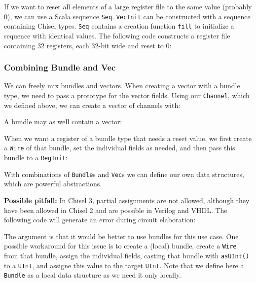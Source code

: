 \documentclass[%
    10pt,
    headinclude, footexclude,
    openright, %
    notitlepage,
    cleardoubleempty,
    headsepline,
    pointlessnumbers,
    bibtotoc, idxtotoc,
    ]{scrbook}
\newcommand{\code}[1]{{\lstinline[basicstyle=\small\ttfamily]{#1}}}
\begin{document}

If we want to reset all elements of a large register file to the same value (probably 0), we
can use a Scala sequence \code{Seq}. \code{VecInit} can be constructed with a sequence
containing Chisel types. \code{Seq} contains a creation function \code{fill} to initialize a sequence
with identical values.
The following code constructs a register file containing 32 registers, each 32-bit wide and reset to
0:


\subsubsection{Combining Bundle and Vec}

We can freely mix bundles and vectors. When creating a vector with a bundle
type, we need to pass a prototype for the vector fields. Using our
\code{Channel}, which we defined above, we can create a vector of channels with:


\noindent A bundle may as well contain a vector:


When we want a register of a bundle type that needs a reset value,
we first create a \code{Wire} of that bundle, set the individual fields
as needed, and then pass this bundle to a \code{RegInit}:


With combinations of \code{Bundle}s and \code{Vec}s we can define our own data
structures, which are powerful abstractions.

{\bf Possible pitfall:} In Chisel 3, partial assignments are not allowed, although they have been
allowed in Chisel 2 and are possible in Verilog and VHDL. The following code will generate
an error during circuit elaboration:


\noindent The argument is that it would be better to use bundles for this use case.
One possible workaround for this issue is to create a (local) bundle, create a \code{Wire}
from that bundle, assign the individual fields, casting that bundle with \code{asUInt()}
to a \code{UInt}, and assigne this value to the target \code{UInt}.
Note that we define here a \code{Bundle} as a local data structure as we need it only
locally.
\end{document}

